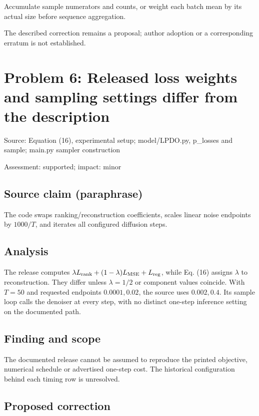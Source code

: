 \documentclass[11pt]{article}
\begin{document}
Accumulate sample numerators and counts, or weight each batch mean by its actual size before sequence aggregation.

The described correction remains a proposal; author adoption or a corresponding erratum is not established.

\section*{Problem 6: Released loss weights and sampling settings differ from the description}

Source: Equation (16), experimental setup; model/LPDO.py, p\_losses and sample; main.py sampler construction

Assessment: supported; impact: minor

\subsection*{Source claim (paraphrase)}

The code swaps ranking/reconstruction coefficients, scales linear noise endpoints by \(1000/T\), and iterates all configured diffusion steps.

\subsection*{Analysis}

The release computes \(\lambda L_{\rm rank}+(1-\lambda)L_{\rm MSE}+L_{\rm reg}\), while Eq. (16) assigns \(\lambda\) to reconstruction. They differ unless \(\lambda=1/2\) or component values coincide. With \(T=50\) and requested endpoints \(0.0001,0.02\), the source uses \(0.002,0.4\). Its sample loop calls the denoiser at every step, with no distinct one-step inference setting on the documented path.

\subsection*{Finding and scope}

The documented release cannot be assumed to reproduce the printed objective, numerical schedule or advertised one-step cost. The historical configuration behind each timing row is unresolved.

\subsection*{Proposed correction}
\end{document}
